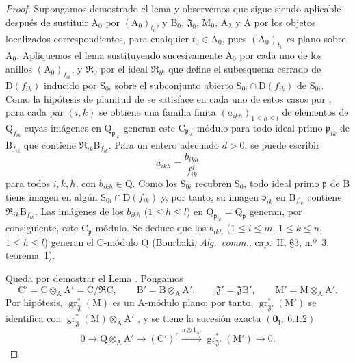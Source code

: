 \begin{proof}
Supongamos demostrado el lema y observemos que sigue siendo aplicable después de sustituir
$\mathrm{A}_0$ por $(\mathrm{A}_0)_{t_0}$, y $\mathrm{B}_0$,
$\mathfrak{J}_0$, $\mathrm{M}_0$, $\mathrm{A}_\lambda$ y $\mathrm{A}$ por
los objetos localizados correspondientes, para cualquier $t_0\in\mathrm{A}_0$, pues
$(\mathrm{A}_0)_{t_0}$ es plano sobre $\mathrm{A}_0$. Apliquemos el lema
sustituyendo sucesivamente $\mathrm{A}_0$ por cada uno de los anillos
$(\mathrm{A}_0)_{f_{ik}}$, y $\mathfrak{R}_0$ por el ideal
$\mathfrak{R}_{ik}$ que define el subesquema cerrado de $\mathrm{D}(f_{ik})$
inducido por $\mathrm{S}_{0i}$ sobre el subconjunto abierto
$\mathrm{S}_{0i}\cap\mathrm{D}(f_{ik})$ de $\mathrm{S}_{0i}$. Como la
hipótesis de planitud de  se satisface en cada uno de estos casos
por , para cada par $(i,k)$ se obtiene una familia finita
$(a_{ikh})_{1\leqslant h\leqslant l}$ de elementos de
$\mathrm{Q}_{f_{ik}}$ cuyas imágenes en $\mathrm{Q}_{\mathfrak{p}_{ik}}$
generan este $\mathrm{C}_{\mathfrak{p}_{ik}}$-módulo para todo ideal primo
$\mathfrak{p}_{ik}$ de $\mathrm{B}_{f_{ik}}$ que contiene
$\mathfrak{R}_{ik}\mathrm{B}_{f_{ik}}$. Para un entero adecuado $d>0$, se
puede escribir
\[
  a_{ikh}=\frac{b_{ikh}}{f_{ik}^{d}}
\]
para todos $i,k,h$, con $b_{ikh}\in\mathrm{Q}$. Como los $\mathrm{S}_{0i}$ recubren $\mathrm{S}_0$, todo ideal primo $\mathfrak{p}$ de $\mathrm{B}$ tiene imagen en algún $\mathrm{S}_{0i}\cap\mathrm{D}(f_{ik})$ y, por tanto, su imagen $\mathfrak{p}_{ik}$ en $\mathrm{B}_{f_{ik}}$ contiene $\mathfrak{R}_{ik}\mathrm{B}_{f_{ik}}$. Las imágenes de los $b_{ikh}$ ($1\leqslant h\leqslant l$) en $\mathrm{Q}_{\mathfrak{p}_{ik}}=\mathrm{Q}_{\mathfrak{p}}$ generan, por consiguiente, este $\mathrm{C}_{\mathfrak{p}}$-módulo. Se deduce que los $b_{ikh}$ ($1\leqslant i\leqslant m$, $1\leqslant k\leqslant n$, $1\leqslant h\leqslant l$) generan el $\mathrm{C}$-módulo $\mathrm{Q}$ (Bourbaki, \emph{Alg.\ comm.}, cap.~II, \S3, n.º~3, teorema~1).

Queda por demostrar el Lema . Pongamos
\[
  \mathrm{C}'=\mathrm{C}\otimes_\mathrm{A}\mathrm{A}'=\mathrm{C}/\mathfrak{R}\mathrm{C},\qquad
  \mathrm{B}'=\mathrm{B}\otimes_\mathrm{A}\mathrm{A}',\qquad
  \mathfrak{J}'=\mathfrak{J}\mathrm{B}',\qquad
  \mathrm{M}'=\mathrm{M}\otimes_\mathrm{A}\mathrm{A}'.
\]
Por hipótesis, $\operatorname{gr}^*_\mathfrak{J}(\mathrm{M})$ es un $\mathrm{A}$-módulo plano; por tanto, $\operatorname{gr}^*_{\mathfrak{J}'}(\mathrm{M}')$ se identifica con $\operatorname{gr}^*_\mathfrak{J}(\mathrm{M})\otimes_\mathrm{A}\mathrm{A}'$ , y se tiene la sucesión exacta $(\mathbf{0}_\mathrm{I},~6.1.2)$
\begin{equation}
  0\longrightarrow\mathrm{Q}\otimes_\mathrm{A}\mathrm{A}'
  \longrightarrow(\mathrm{C}')^r
  \xrightarrow{u\otimes 1_{\mathrm{A}'}}
  \operatorname{gr}^*_{\mathfrak{J}'}(\mathrm{M}')
  \longrightarrow 0.
  \label{IV.11.2.9.7}
\tag{11.2.9.7}
\end{equation}


\end{proof}
